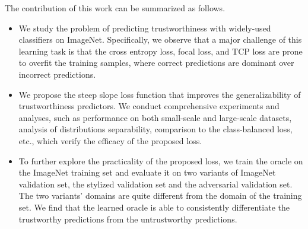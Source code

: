 
The contribution of this work can be summarized as follows.
\begin{itemize}
    \item We study the problem of predicting trustworthiness with widely-used classifiers on ImageNet. Specifically, we observe that a major challenge of this learning task is that the cross entropy loss, focal loss, and TCP loss are prone to overfit the training samples, where correct predictions are dominant over incorrect predictions.
    \item We propose the steep slope loss function that improves the generalizability of trustworthiness predictors.
    We conduct comprehensive experiments and analyses, such as performance on both small-scale and large-scale datasets, analysis of distributions separability, comparison to the class-balanced loss, etc., which verify the efficacy of the proposed loss.
    \item To further explore the practicality of the proposed loss, we train the oracle on the ImageNet training set and evaluate it on two variants of ImageNet validation set, \ie the stylized validation set and the adversarial validation set.
    The two variants' domains are quite different from the domain of the training set.
    We find that the learned oracle is able to consistently differentiate the trustworthy predictions from the untrustworthy predictions.
\end{itemize}







